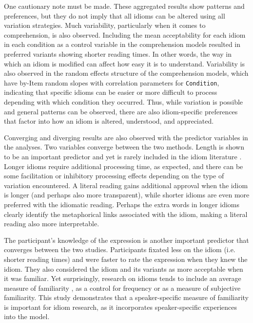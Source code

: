 \documentclass[output=paper
,modfonts
,nonflat]{langsci/langscibook}
\begin{document}
One cautionary note must be made. These aggregated results show patterns and preferences, but they do not imply that all idioms can be altered using all variation strategies. Much variability, particularly when it comes to comprehension, is also observed. Including the mean acceptability for each idiom in each condition as a control variable in the comprehension models resulted in preferred variants showing shorter reading times. In other words, the way in which an idiom is modified can affect how easy it is to understand. Variability is also observed in the random effects structure of the comprehension models, which have by-Item random slopes with correlation parameters for \texttt{Condition}, indicating that specific idioms can be easier or more difficult to process depending with which condition they occurred. Thus, while variation is possible and general patterns can be observed, there are also idiom-specific preferences that factor into how an idiom is altered, understood, and appreciated. 

   


Converging and diverging results  are also observed with the predictor variables in the analyses. Two variables converge between the two methods. Length is shown to be an important predictor and yet is rarely included in the idiom literature \citep[cf.][]{FanariEtAl2010}. Longer idioms require additional processing time, as expected, and there can be some facilitation or inhibitory processing effects depending on the type of variation encountered. A literal reading gains additional approval when the idiom is longer (and perhaps also more transparent), while shorter idioms are even more preferred with the idiomatic reading. Perhaps the extra words in longer idioms clearly identify the metaphorical links associated with the idiom, making a literal reading also more interpretable.

The participant's knowledge of the expression is another important predictor that converges between the two studies.  Participants fixated less on the idiom (i.e. shorter reading times) and were faster to rate the expression when they knew the idiom. They also considered the idiom and its variants as more acceptable when it was familiar. Yet surprisingly, research on idioms tends to include an average measure of familiarity \citep[cf.][]{TitoneConnine1994}, as a control for frequency or as a measure of subjective familiarity. This study demonstrates that a speaker-specific measure of familiarity is important for idiom research, as it incorporates speaker-specific experiences into the model.
\end{document}
